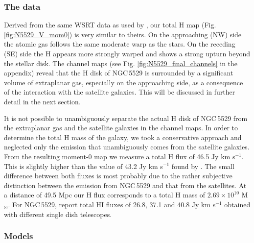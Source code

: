 \documentclass{aa}
\begin{document}
\subsubsection{The data}

Derived from the same WSRT data as used by \cite{kregel04}, our total H{} map (Fig. \ref{fig:N5529_V_mom0}) is very similar to theirs. On the approaching (NW) side the atomic gas follows the same moderate warp as the stars. On the receding (SE) side the H{} appears more strongly warped and shows a strong upturn beyond the stellar disk. The channel maps (see Fig. \ref{fig:N5529_final_channels} in the appendix) reveal that the H{} disk of NGC\,5529 is surrounded by a significant volume of extraplanar gas, especially on the approaching side, as a consequence of the interaction with the satellite galaxies. This will be discussed in further detail in the next section.
\par
It is not possible to unambiguously separate the actual H{} disk of NGC\,5529 from the extraplanar gas and the satellite galaxies in the channel maps. In order to determine the total H{} mass of the galaxy, we took a conservative approach and neglected only the emission that unambiguously comes from the satellite galaxies. From the resulting moment-0 map we measure a total H{} flux of 46.5 Jy km s$^{-1}$. This is slightly higher than the value of 43.2 Jy km s$^{-1}$ found by \cite{kregel04}. The small difference between both fluxes is most probably due to the rather subjective distinction between the emission from NGC\,5529 and that from the satellites. At a distance of 49.5 Mpc our H{} flux corresponds to a total H{} mass of $2.69 \times 10^{10}$ M$_{\odot}$. For NGC\,5529, \cite{huchtmeier89} report total HI fluxes of 26.8, 37.1 and 40.8 Jy km s$^{-1}$ obtained with different single dish telescopes.

\subsubsection{Models}
\label{sec:N5529_models}
\end{document}
